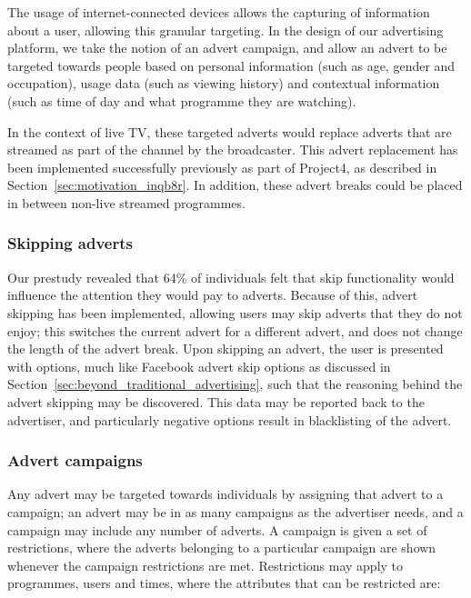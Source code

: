 	The usage of internet-connected devices allows the capturing of information about a user, allowing this granular targeting. In the design of our advertising platform, we take the notion of an advert campaign, 
	and allow an advert to be targeted towards people based on personal information (such as age, gender and occupation), usage data (such as viewing history) and contextual information (such as time of day and what programme they are watching).

	In the context of live TV, these targeted adverts would replace adverts that are streamed as part of the channel by the broadcaster. This advert replacement has been implemented successfully previously as part of Project4, as described in Section~\ref{sec:motivation_inqb8r}. In addition, these advert breaks could be placed in between non-live streamed programmes.

	\subsubsection{Skipping adverts}

	Our prestudy revealed that 64\% of individuals felt that skip functionality would influence the attention they would pay to adverts. Because of this, advert skipping has been implemented, allowing users may skip adverts that they do not enjoy; this switches the current advert for a different advert, and does not change the length of the advert break. Upon skipping an advert, the user is presented with options, much like Facebook advert skip options as discussed in Section~\ref{sec:beyond_traditional_advertising}, such that the reasoning behind the advert skipping may be discovered. This data may be reported back to the advertiser, and particularly negative options result in blacklisting of the advert. 


	\subsubsection{Advert campaigns}

	Any advert may be targeted towards individuals by assigning that advert to a campaign; an advert may be in as many campaigns as the advertiser needs, and a campaign may include any number of adverts. A campaign is given a set of restrictions, where the adverts belonging to a particular campaign are shown whenever the campaign restrictions are met. Restrictions may apply to programmes, users and times, where the attributes that can be restricted are:

